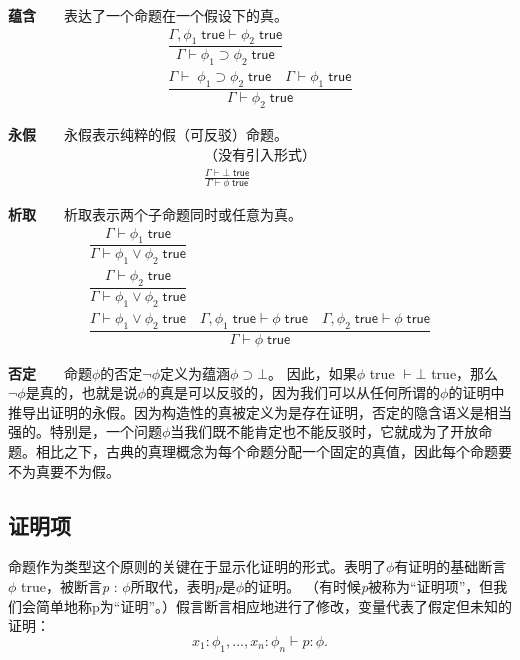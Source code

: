 \textbf{蕴含}${\qquad}$表达了一个命题在一个假设下的真。
\begin{subequations}
    \begin{gather}
    \dfrac{\Gamma,\phi_1\; \mathsf{true} \vdash \phi_2\; \mathsf{true}}{\Gamma \vdash \phi_1 \supset \phi_2\; \mathsf{true}}\\
    \dfrac{\Gamma \vdash\; \phi_1 \supset \phi_2\; \mathsf{true}\quad\Gamma \vdash \phi_1\; \mathsf{true}}{\Gamma \vdash \phi_2\; \mathsf{true}}
    \end{gather}
\end{subequations}


\textbf{永假}${\qquad}$永假表示纯粹的假（可反驳）命题。
\begin{subequations}
    \begin{gather}
    （没有引入形式）\\
    \frac{\Gamma \vdash \bot\; \mathsf{true}}{\Gamma \vdash \phi\; \mathsf{true}}
    \end{gather}
\end{subequations}

\textbf{析取}${\qquad}$析取表示两个子命题同时或任意为真。
\begin{subequations}
    \begin{gather}
       \dfrac{\Gamma \vdash \phi_1\; \mathsf{true}}
              {\Gamma \vdash \phi_1 \lor \phi_2\; \mathsf{true}}\\
       \dfrac{\Gamma \vdash \phi_2\; \mathsf{true}}
              {\Gamma \vdash \phi_1 \lor \phi_2\; \mathsf{true}}\\
       \dfrac{\Gamma \vdash \phi_1 \lor \phi_2\; \mathsf{true}\quad\Gamma,\phi_1\; \mathsf{true} \vdash \phi\; \mathsf{true}\quad\Gamma,\phi_2 \; \mathsf{true}\vdash \phi\; \mathsf{true}}
              {\Gamma \vdash \phi\; \mathsf{true}}
    \end{gather}
\end{subequations}

\textbf{否定}${\qquad}$命题${\phi}$的否定${\lnot\phi}$定义为蕴涵${\phi\supset\bot}$。 因此，如果${\phi}$ true ${\vdash\bot}$ true，那么${\lnot\phi}$是真的，也就是说${\phi}$的真是可以反驳的，因为我们可以从任何所谓的${\phi}$的证明中推导出证明的永假。因为构造性的真被定义为是存在证明，否定的隐含语义是相当强的。特别是，一个问题${\phi}$当我们既不能肯定也不能反驳时，它就成为了开放命题。相比之下，古典的真理概念为每个命题分配一个固定的真值，因此每个命题要不为真要不为假。
\subsection{证明项}
命题作为类型这个原则的关键在于显示化证明的形式。表明了${\phi}$有证明的基础断言${\phi}$ true，被断言\textit{p} : ${\phi}$所取代，表明\textit{p}是${\phi}$的证明。 （有时候\textit{p}被称为“证明项”，但我们会简单地称p为“证明”。）假言断言相应地进行了修改，变量代表了假定但未知的证明：
$$x_1 : \phi_1,...,x_n : \phi_n\vdash p : \phi.$$


